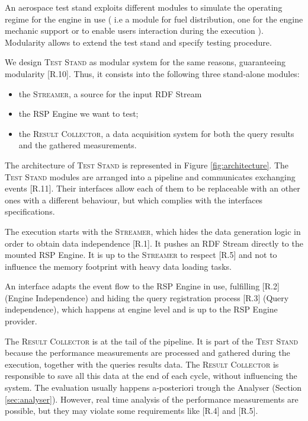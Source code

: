 \noindent An aerospace test stand exploits different modules to simulate the operating regime for the engine in use ( i.e a module for fuel distribution, one for the engine mechanic support or to enable users interaction during the execution ). Modularity allows to extend the test stand and specify testing procedure. 

We design \name \textsc{Test Stand} as modular system for the same reasons, guaranteeing modularity [R.10]. Thus, it consists into the following three stand-alone modules:
\begin{itemize}
\item the \textsc{Streamer}, a source for the input RDF Stream
\item the RSP Engine we want to test;
\item the \textsc{Result Collector}, a data acquisition system for both the query results and the gathered measurements.
\end{itemize}

\noindent The architecture of \name \textsc{Test Stand} is represented in Figure \ref{fig:architecture}. The \textsc{Test Stand} modules  are arranged into a pipeline and communicates exchanging events [R.11]. Their interfaces allow each of them to be replaceable with an other ones with a different behaviour, but which complies with the interfaces specifications.

The execution starts with the \textsc{Streamer}, which hides the data generation logic in order to obtain data independence [R.1]. It pushes an RDF Stream directly to the mounted RSP Engine. It is up to the \textsc{Streamer} to respect [R.5] and not to influence the memory footprint with heavy data loading tasks. 

An interface adapts the event flow to the RSP Engine in use, fulfilling [R.2] (Engine Independence) and hiding the query registration process [R.3] (Query independence), which happens at engine level and is up to the RSP Engine provider.

The \textsc{Result Collector} is at the tail of the pipeline. It is part of the \textsc{Test Stand} because the performance measurements are processed and gathered during the execution, together with the queries results data. The \textsc{Result Collector} is responsible to save all this data at the end of each cycle, without influencing the system. The evaluation usually happens a-posteriori trough the Analyser (Section \ref{sec:analyser}). However, real time analysis of the performance measurements are possible, but they may violate some requirements like [R.4] and [R.5]. 

